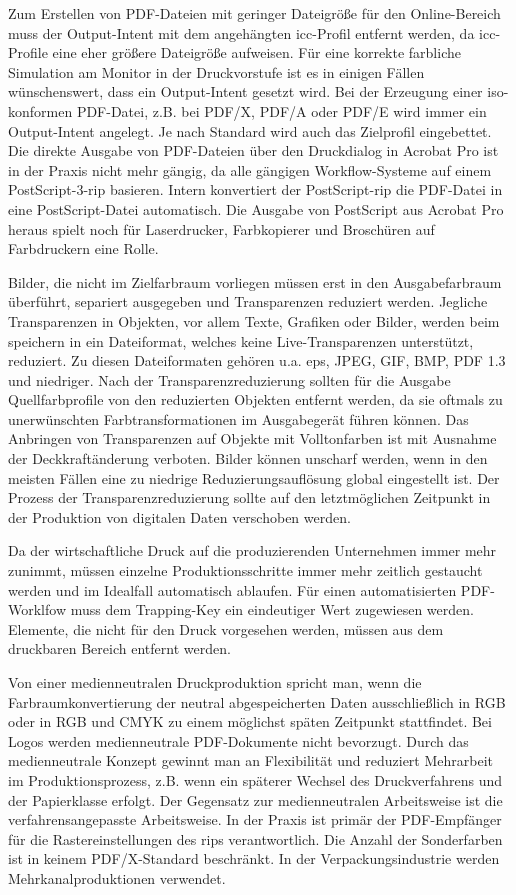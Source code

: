 Zum Erstellen von PDF-Dateien mit geringer Dateigröße für den Online-Bereich muss der Output-Intent mit dem angehängten \gls{icc}-Profil entfernt werden, da \gls{icc}-Profile eine eher größere Dateigröße aufweisen. Für eine korrekte farbliche Simulation am Monitor in der Druckvorstufe ist es in einigen Fällen wünschenswert, dass ein Output-Intent gesetzt wird. Bei der Erzeugung einer \gls{iso}-konformen PDF-Datei, z.B. bei PDF/X, PDF/A oder PDF/E wird immer ein Output-Intent angelegt. Je nach Standard wird auch das Zielprofil eingebettet. Die direkte Ausgabe von PDF-Dateien über den Druckdialog in Acrobat Pro ist in der Praxis nicht mehr gängig, da alle gängigen Workflow-Systeme auf einem PostScript-3-\gls{rip} basieren. Intern konvertiert der PostScript-\gls{rip} die PDF-Datei in eine PostScript-Datei automatisch. Die Ausgabe von PostScript aus Acrobat Pro heraus spielt noch für Laserdrucker, Farbkopierer und Broschüren auf Farbdruckern eine Rolle.
\cite{schneeberger}

Bilder, die nicht im Zielfarbraum vorliegen müssen erst in den Ausgabefarbraum überführt, separiert ausgegeben und Transparenzen reduziert werden. Jegliche Transparenzen in Objekten, vor allem Texte, Grafiken oder Bilder, werden beim speichern in ein Dateiformat, welches keine Live-Transparenzen unterstützt, reduziert. Zu diesen Dateiformaten gehören u.a. \gls{eps}, JPEG, GIF, BMP, PDF 1.3 und niedriger. Nach der Transparenzreduzierung sollten für die Ausgabe Quellfarbprofile von den reduzierten Objekten entfernt werden, da sie oftmals zu unerwünschten Farbtransformationen im Ausgabegerät führen können. Das Anbringen von Transparenzen auf Objekte mit Volltonfarben ist mit Ausnahme der Deckkraftänderung verboten. Bilder können unscharf werden, wenn in den meisten Fällen eine zu niedrige Reduzierungsauflösung global eingestellt ist. Der Prozess der Transparenzreduzierung sollte auf den letztmöglichen Zeitpunkt in der Produktion von digitalen Daten verschoben werden. 
\cite{schneeberger}

Da der wirtschaftliche Druck auf die produzierenden Unternehmen immer mehr zunimmt, müssen einzelne Produktionsschritte immer mehr zeitlich gestaucht werden und im Idealfall automatisch ablaufen. Für einen automatisierten PDF-Worklfow muss dem Trapping-Key ein eindeutiger Wert zugewiesen werden. Elemente, die nicht für den Druck vorgesehen werden, müssen aus dem druckbaren Bereich entfernt werden.

Von einer medienneutralen Druckproduktion spricht man, wenn die Farbraumkonvertierung der neutral abgespeicherten Daten ausschließlich in RGB oder in RGB und CMYK zu einem möglichst späten Zeitpunkt stattfindet. Bei Logos werden medienneutrale PDF-Dokumente nicht bevorzugt. Durch das medienneutrale Konzept gewinnt man an Flexibilität und reduziert Mehrarbeit im Produktionsprozess, z.B. wenn ein späterer Wechsel des Druckverfahrens und der Papierklasse erfolgt. Der Gegensatz zur medienneutralen Arbeitsweise ist die verfahrensangepasste Arbeitsweise. In der Praxis ist primär der PDF-Empfänger für die Rastereinstellungen des \gls{rip}s verantwortlich. Die Anzahl der Sonderfarben ist in keinem PDF/X-Standard beschränkt. In der Verpackungsindustrie werden Mehrkanalproduktionen verwendet.
\cite{schneeberger}

